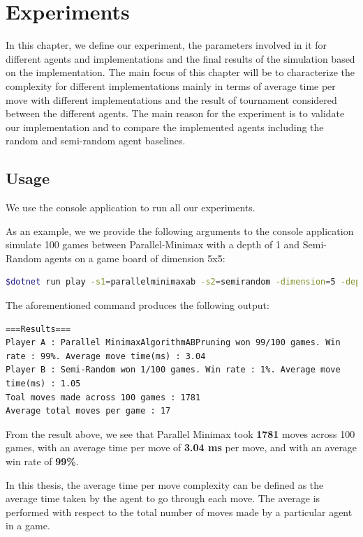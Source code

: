 \chapter{Experiments} \label{Experiments}

In this chapter, we define our experiment, the parameters involved in it for different agents and implementations and the final results of the simulation based on the implementation. The main focus of this chapter will be to characterize the complexity for different implementations mainly in terms of average time per move with different implementations and the result of tournament considered between the different agents. The main reason for the experiment is to validate our implementation and to compare the implemented agents including the random and semi-random agent baselines.

\section{Usage}

We use the console application to run all our experiments.

As an example, we we provide the following arguments to the console application simulate 100 games between Parallel-Minimax with a depth of 1 and Semi-Random agents on a game board of dimension 5x5:

\begin{lstlisting}[language=bash]
$dotnet run play -s1=parallelminimaxab -s2=semirandom -dimension=5 -depth=1 -sim -numsim=100
\end{lstlisting}

The aforementioned command produces the following output:

\begin{lstlisting}
===Results===
Player A : Parallel MinimaxAlgorithmABPruning won 99/100 games. Win rate : 99%. Average move time(ms) : 3.04
Player B : Semi-Random won 1/100 games. Win rate : 1%. Average move time(ms) : 1.05
Toal moves made across 100 games : 1781
Average total moves per game : 17
\end{lstlisting}

From the result above, we see that Parallel Minimax took \textbf{1781} moves across 100 games, with an average time per move of \textbf{3.04 ms} per move, and with an average win rate of \textbf{99\%}.

In this thesis, the average time per move complexity can be defined as the average time taken by the agent to go through each move. The average is performed with respect to the total number of moves made by a particular agent in a game.

